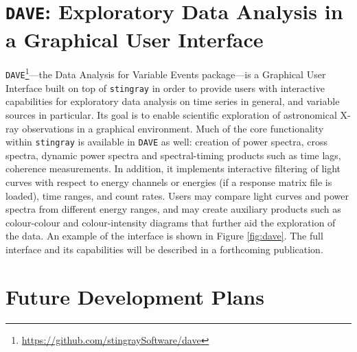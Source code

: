 \documentclass[twocolumn]{aastex62}
\newcommand{\stingray}{\texttt{stingray}\xspace}
\newcommand{\dave}{\texttt{DAVE}\xspace}
\begin{document}
\section{\texttt{DAVE}: Exploratory Data Analysis in a Graphical User Interface}
\label{sec:dave}

\dave\footnote{\url{https://github.com/stingraySoftware/dave}}---the Data Analysis for Variable Events package---is a Graphical User Interface built on top of \stingray in order to provide users with interactive capabilities for exploratory data analysis on time series in general, and variable sources in particular. Its goal is to enable scientific exploration of astronomical X-ray observations in a graphical environment. Much of the core functionality within \stingray is available in \dave as well: creation of power spectra, cross spectra, dynamic power spectra and spectral-timing products such as time lags, coherence measurements. In addition, it implements interactive filtering of light curves with respect to energy channels or energies (if a response matrix file is loaded), time ranges, and count rates. Users may compare light curves and power spectra from different energy ranges, and may create auxiliary products such as colour-colour and colour-intensity diagrams that further aid the exploration of the data. An example of the interface is shown in Figure \ref{fig:dave}. The full interface and its capabilities will be described in a forthcoming publication. 



\section{Future Development Plans}
\label{sec:future}
\end{document}
